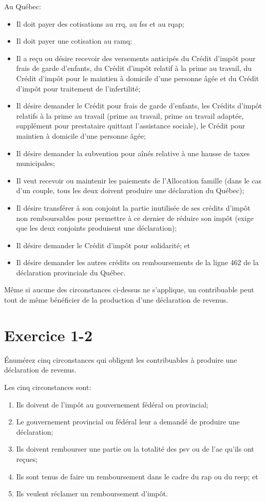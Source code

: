 Au Québec:
\qc
\begin{itemize}
	\item Il doit payer des cotisations au \acrfull{rrq}, au \acrfull{fss} et au \acrfull{rqap};
	\item Il doit payer une cotisation au \acrfull{ramq};
	\item Il a reçu ou désire recevoir des versements anticipés du Crédit d'impôt pour frais de garde d'enfants, du Crédit d'impôt relatif à la prime au travail, du Crédit d'impôt pour le maintien à domicile d'une personne âgée et du Crédit d'impôt pour traitement de l'infertilité;
	\item Il désire demander le Crédit pour frais de garde d'enfants, les Crédits d'impôt relatifs à la prime au travail (prime au travail, prime au travail adaptée, supplément pour prestataire quittant l'assistance sociale), le Crédit pour maintien à domicile d'une personne âgée;
	\item Il désire demander la subvention pour aînés relative à une hausse de taxes municipales;
	\item Il veut recevoir ou maintenir les paiements de l'Allocation famille (dans le cas d'un couple, tous les deux doivent produire une déclaration du Québec);
	\item Il désire transférer à son conjoint la partie inutilisée de ses crédits d'impôt non remboursables pour permettre à ce dernier de réduire son impôt (exige que les deux conjoints produisent une déclaration);
	\item Il désire demander le Crédit d'impôt pour solidarité; et
	\item Il désire demander les autres crédits ou remboursements de la ligne 462 de la déclaration provinciale du Québec.
\end{itemize}

Même si aucune des circonstances ci-dessus ne s'applique, un contribuable peut tout de même bénéficier de la production d'une déclaration de revenus.



\section{Exercice 1-2}
\setcounter{question}{0}
\begin{question}
	Énumérez cinq circonstances qui obligent les contribuables à produire une déclaration de revenus.
\end{question}
Les cinq circonstances sont:
\begin{enumerate}
	\item Ils doivent de l'impôt au gouvernement fédéral ou provincial;
	\item Le gouvernement provincial ou fédéral leur a demandé de produire une déclaration;
	\item Ils doivent rembourser une partie ou la totalité des \acrfull{psv} ou de l'\acrfull{ae} qu'ils ont reçues;
	\item Ils sont tenus de faire un remboursement dans le cadre du \acrfull{rap} ou du \acrfull{reep}; et
	\item Ils veulent réclamer un remboursement d'impôt.
\end{enumerate}

